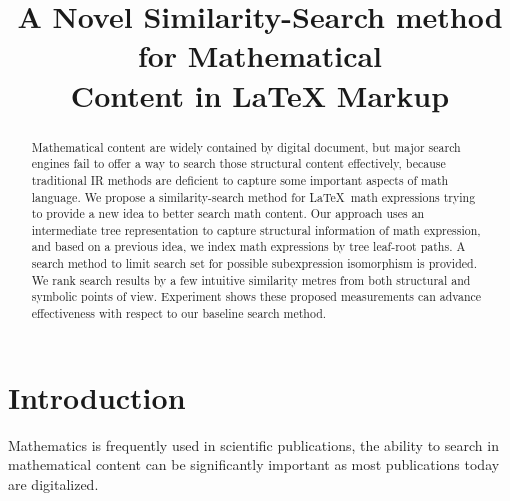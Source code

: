 \documentclass{acm_proc_article-sp}
\begin{document}
\title{A Novel Similarity-Search method for Mathematical \\ Content in {\ttlit LaTeX} Markup}


\maketitle
\begin{abstract}
Mathematical content are widely contained by digital document, but major search engines fail to offer a way to search those structural content effectively, because traditional IR methods are deficient to capture some important aspects of math language. 
We propose a similarity-search method for \LaTeX\ math expressions trying to provide a new idea to better search math content.
Our approach uses an intermediate tree representation to capture structural information of math expression, and based on a previous idea, we index math expressions by tree leaf-root paths. 
A search method to limit search set for possible subexpression isomorphism is provided.
We rank search results by a few intuitive similarity metres from both structural and symbolic points of view. 
Experiment shows these proposed measurements can advance effectiveness with respect to our baseline search method.
\end{abstract}



\section{Introduction}
\label{intro}
Mathematics is frequently used in scientific publications, 
the ability to search in mathematical content can be significantly important as most publications today are digitalized.
\end{document}
